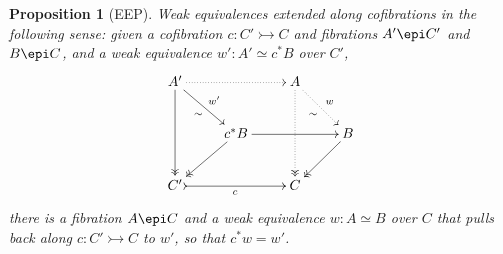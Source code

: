 \documentclass[12pt]{article}
\newcommand{\mono}{\ensuremath{\rightarrowtail}}
\newtheorem{proposition}[theorem]{Proposition}
\theoremstyle{remark}
\theoremstyle{definition}
\begin{document}
\begin{proposition}[EEP]
Weak equivalences extended along cofibrations in the following sense: given a cofibration $c:C' \mono C$ and fibrations $A'\epi C'$ and $B\epi C$, and a weak equivalence $w':A' \simeq c^*B$ over $C'$,
\begin{equation}\label{diag:EEP}
\xymatrix{
A' \ar@{->>}[dd] \ar[rd]_{\sim}^{w'} \ar@{..>}[rr] && A \ar@{..>>}[dd] \ar@{..>}[rd]_{\sim}^{w} \\
& c^*B \ar@{->>}[ld] \ar[rr]  && B \ar@{->>}[ld] \\
C' \ar@{>->}[rr]_c && C
}
\end{equation}
there is a fibration $A\epi C$ and a weak equivalence $w: A \simeq B$ over $C$ that pulls back along $c:C' \mono C$ to $w'$, so that $c^*w = w'$.

\end{proposition}
%
\end{document}
